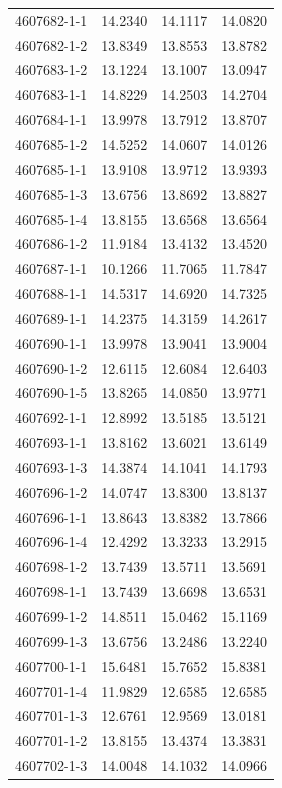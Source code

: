 \begin{longtable}{lrrr}
4607682-1-1 & 14.2340 & 14.1117 & 14.0820 \\
4607682-1-2 & 13.8349 & 13.8553 & 13.8782 \\
4607683-1-2 & 13.1224 & 13.1007 & 13.0947 \\
4607683-1-1 & 14.8229 & 14.2503 & 14.2704 \\
4607684-1-1 & 13.9978 & 13.7912 & 13.8707 \\
4607685-1-2 & 14.5252 & 14.0607 & 14.0126 \\
4607685-1-1 & 13.9108 & 13.9712 & 13.9393 \\
4607685-1-3 & 13.6756 & 13.8692 & 13.8827 \\
4607685-1-4 & 13.8155 & 13.6568 & 13.6564 \\
4607686-1-2 & 11.9184 & 13.4132 & 13.4520 \\
4607687-1-1 & 10.1266 & 11.7065 & 11.7847 \\
4607688-1-1 & 14.5317 & 14.6920 & 14.7325 \\
4607689-1-1 & 14.2375 & 14.3159 & 14.2617 \\
4607690-1-1 & 13.9978 & 13.9041 & 13.9004 \\
4607690-1-2 & 12.6115 & 12.6084 & 12.6403 \\
4607690-1-5 & 13.8265 & 14.0850 & 13.9771 \\
4607692-1-1 & 12.8992 & 13.5185 & 13.5121 \\
4607693-1-1 & 13.8162 & 13.6021 & 13.6149 \\
4607693-1-3 & 14.3874 & 14.1041 & 14.1793 \\
4607696-1-2 & 14.0747 & 13.8300 & 13.8137 \\
4607696-1-1 & 13.8643 & 13.8382 & 13.7866 \\
4607696-1-4 & 12.4292 & 13.3233 & 13.2915 \\
4607698-1-2 & 13.7439 & 13.5711 & 13.5691 \\
4607698-1-1 & 13.7439 & 13.6698 & 13.6531 \\
4607699-1-2 & 14.8511 & 15.0462 & 15.1169 \\
4607699-1-3 & 13.6756 & 13.2486 & 13.2240 \\
4607700-1-1 & 15.6481 & 15.7652 & 15.8381 \\
4607701-1-4 & 11.9829 & 12.6585 & 12.6585 \\
4607701-1-3 & 12.6761 & 12.9569 & 13.0181 \\
4607701-1-2 & 13.8155 & 13.4374 & 13.3831 \\
4607702-1-3 & 14.0048 & 14.1032 & 14.0966 \\

\end{longtable}

